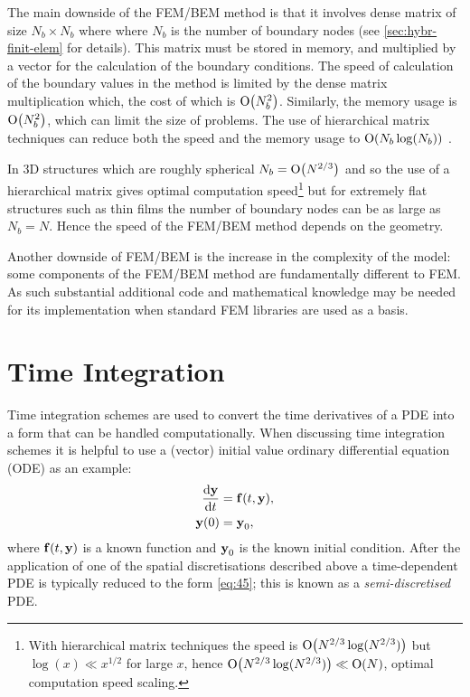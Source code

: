 The main downside of the FEM/BEM method is that it involves dense matrix of size $N_b \times N_b$ where where $N_b$ is the number of boundary nodes (see \cref{sec:hybr-finit-elem} for details).
This matrix must be stored in memory, and multiplied by a vector for the calculation of the boundary conditions.
The speed of calculation of the boundary values in the method is limited by the dense matrix multiplication which, the cost of which is $\mathrm{O}{\left( N_b^2 \right)}$.
Similarly, the memory usage is $\mathrm{O}{\left( N_b^2 \right)}$, which can limit the size of problems.
The use of hierarchical matrix techniques can reduce both the speed and the memory usage to $\mathrm{O}{\left( N_b \log(N_b) \right)}$ \cite{Knittel2009}.

In 3D structures which are roughly spherical $N_b = \mathrm{O}{\left( N^{2/3} \right)}$ and so the use of a hierarchical matrix gives optimal computation speed\footnote{With hierarchical matrix techniques the speed is $\mathrm{O}{\left( N^{2/3}\log(N^{2/3}) \right)}$ but $\log(x) \ll x^{1/2}$ for large $x$, hence $\mathrm{O}{\left( N^{2/3}\log(N^{2/3}) \right)} \ll \mathrm{O}{\left( N \right)}$, \ie optimal computation speed scaling.} but for extremely flat structures such as thin films the number of boundary nodes can be as large as $N_b = N$.
Hence the speed of the FEM/BEM method depends on the geometry.

Another downside of FEM/BEM is the increase in the complexity of the model: some components of the FEM/BEM method are fundamentally different to FEM.
As such substantial additional code and mathematical knowledge may be needed for its implementation when standard FEM libraries are used as a basis.


\section{Time Integration}
\label{sec:time-discretisation}

Time integration schemes are used to convert the time derivatives of a PDE into a form that can be handled computationally.
When discussing time integration schemes it is helpful to use a (vector) initial value ordinary differential equation (ODE) as an example:
\begin{equation}
  \begin{aligned}
  \frac{\textrm{d} \boldsymbol{\mathrm{y}}}{\textrm{d}t} &= {\boldsymbol{\mathrm{f}}{\left( t, \boldsymbol{\mathrm{y}} \right)}}, \\
  \boldsymbol{\mathrm{y}}(0) &= \boldsymbol{\mathrm{y}}_0,
  \label{eq:45}
  \end{aligned}
\end{equation}
where ${\boldsymbol{\mathrm{f}}}(t,\boldsymbol{\mathrm{y}})$ is a known function and $\boldsymbol{\mathrm{y}}_0$ is the known initial condition.
After the application of one of the spatial discretisations described above a time-dependent PDE is typically reduced to the form \cref{eq:45}; this is known as a \emph{semi-discretised} PDE.

